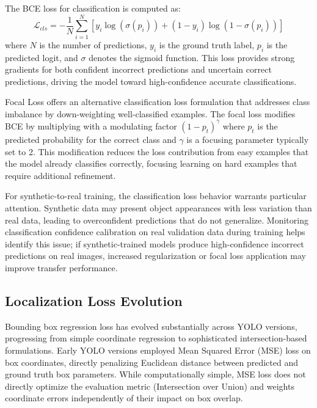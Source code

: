 The BCE loss for classification is computed as:
\begin{equation}
\mathcal{L}_{cls} = -\frac{1}{N} \sum_{i=1}^{N} \left[ y_i \log(\sigma(p_i)) + (1-y_i) \log(1-\sigma(p_i)) \right]
\end{equation}
where $N$ is the number of predictions, $y_i$ is the ground truth label, $p_i$ is the predicted logit, and $\sigma$ denotes the sigmoid function. This loss provides strong gradients for both confident incorrect predictions and uncertain correct predictions, driving the model toward high-confidence accurate classifications.

Focal Loss offers an alternative classification loss formulation that addresses class imbalance by down-weighting well-classified examples. The focal loss modifies BCE by multiplying with a modulating factor $(1-p_t)^\gamma$ where $p_t$ is the predicted probability for the correct class and $\gamma$ is a focusing parameter typically set to 2. This modification reduces the loss contribution from easy examples that the model already classifies correctly, focusing learning on hard examples that require additional refinement.

For synthetic-to-real training, the classification loss behavior warrants particular attention. Synthetic data may present object appearances with less variation than real data, leading to overconfident predictions that do not generalize. Monitoring classification confidence calibration on real validation data during training helps identify this issue; if synthetic-trained models produce high-confidence incorrect predictions on real images, increased regularization or focal loss application may improve transfer performance.

\subsection{Localization Loss Evolution}

Bounding box regression loss has evolved substantially across YOLO versions, progressing from simple coordinate regression to sophisticated intersection-based formulations. Early YOLO versions employed Mean Squared Error (MSE) loss on box coordinates, directly penalizing Euclidean distance between predicted and ground truth box parameters. While computationally simple, MSE loss does not directly optimize the evaluation metric (Intersection over Union) and weights coordinate errors independently of their impact on box overlap.

